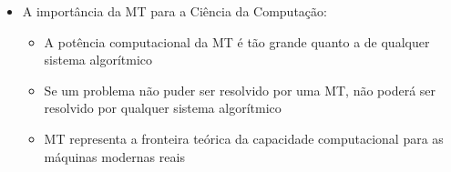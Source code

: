\documentclass[12pt]{article}
\begin{document}
\begin{itemize}
\begin{itemize}
\begin{itemize}
            em fita
            \item Os padrões de bits (0 e 1) correspondem ao alfabeto da fita
        \end{itemize}
        \item A importância da MT para a Ciência da Computação:
        \begin{itemize}
            \item A potência computacional da MT é tão grande quanto a de 
            qualquer sistema algorítmico
            \item Se um problema não puder ser resolvido por uma MT, não poderá 
            ser resolvido por qualquer sistema algorítmico
            \item MT representa a fronteira teórica da capacidade computacional 
            para as máquinas modernas reais
        \end{itemize}
    \end{itemize}
\end{itemize}
\end{document}
